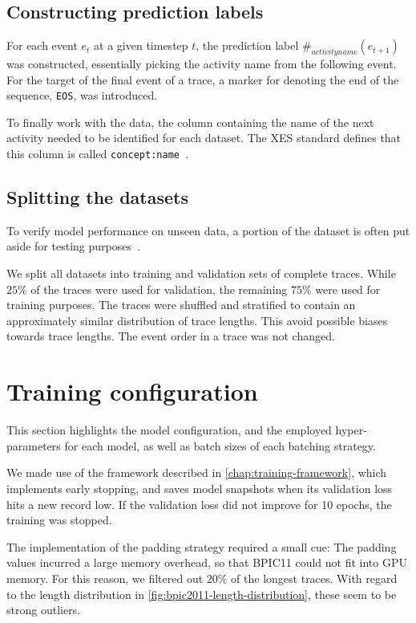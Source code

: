 \subsection*{Constructing prediction labels}
For each event $e_t$ at a given timestep $t$, the prediction label $\#_{activity name}(e_{t+1})$ was constructed, essentially picking the activity name from the following event. For the target of the final event of a trace, a marker for denoting the end of the sequence, \verb=EOS=, was introduced.

To finally work with the data, the column containing the name of the next activity needed to be identified for each dataset. The XES standard defines that this column is called \verb=concept:name=~\cite{Aalst2016}.

\subsection*{Splitting the datasets}
To verify model performance on unseen data, a portion of the dataset is often put aside for testing purposes~\cite{kuhn2013applied}.

We split all datasets into training and validation sets of complete traces. While $25\%$ of the traces were used for validation, the remaining $75\%$ were used for training purposes. The traces were shuffled and stratified to contain an approximately similar distribution of trace lengths. This avoid possible biases towards trace lengths. The event order in a trace was not changed.

\section{Training configuration}\label{sec:eval:test-setup}
This section highlights the model configuration, and the employed hyper-parameters for each model, as well as batch sizes of each batching strategy.

We made use of the framework described in \autoref{chap:training-framework}, which implements early stopping, and saves model snapshots when its validation loss hits a new record low. If the validation loss did not improve for 10 epochs, the training was stopped.

The implementation of the padding strategy required a small cue: The padding values incurred a large memory overhead, so that BPIC11 could not fit into GPU memory. For this reason, we filtered out $20\%$ of the longest traces. With regard to the length distribution in \autoref{fig:bpic2011-length-distribution}, these seem to be strong outliers.

